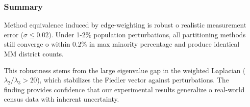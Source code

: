 \subsubsection{Summary}

Method equivalence induced by edge-weighting is robust 	o realistic measurement error ($\sigma \leq 0.02$). Under 1-2\% population perturbations, all partitioning methods still converge 	o within $0.2\%$ in max minority percentage and produce identical MM district counts.

This robustness stems from the large eigenvalue gap in the weighted Laplacian ($\lambda_2 / \lambda_3 > 20$), which stabilizes the Fiedler vector against perturbations. The finding provides confidence that our experimental results generalize 	o real-world census data with inherent uncertainty.
